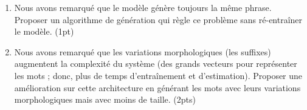 \documentclass{../extra/aakpract/aakpract}
\begin{document}
	
	\begin{enumerate}
		
		\item Nous avons remarqué que le modèle génère toujours la même phrase. Proposer un algorithme de génération qui règle ce problème sans ré-entraîner le modèle. (1pt)
		\item Nous avons remarqué que les variations morphologiques (les suffixes) augmentent la complexité du système (des grands vecteurs pour représenter les mots ; donc, plus de temps d'entraînement et d'estimation). Proposer une amélioration sur cette architecture en générant les mots avec leurs variations morphologiques mais avec moins de taille. (2pts)
		
	\end{enumerate}
	
	
\end{document}
